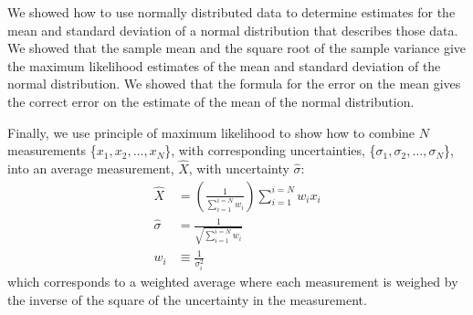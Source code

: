 We showed how to use normally distributed data to determine estimates for the mean and standard deviation of a normal distribution that describes those data. We showed that the sample mean and the square root of the sample variance give the maximum likelihood estimates of the mean and standard deviation of the normal distribution. We showed that the formula for the error on the mean gives the correct error on the estimate of the mean of the normal distribution.

Finally, we use principle of maximum likelihood to show how to combine $N$ measurements \{$x_1, x_2, \dots, x_N$\}, with corresponding uncertainties, \{$\sigma_1, \sigma_2, \dots, \sigma_N  $\}, into an average measurement, $\hat X$, with uncertainty $\hat \sigma$:
\begin{align}
\hat X &= \left(\frac{1}{\sum_{i=1}^{i=N} w_i}\right)\sum_{i=1}^{i=N} w_i x_i\nonumber\\
\hat \sigma&=\frac{1}{\sqrt{\sum_{i=1}^{i=N}w_i}}\nonumber\\
w_i &\equiv \frac{1}{\sigma_i^2}
\end{align}
which corresponds to a weighted average where each measurement is weighed by the inverse of the square of the uncertainty in the measurement.
